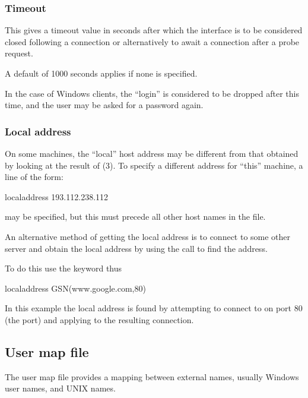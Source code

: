 \subsubsection{Timeout}
This gives a timeout value in seconds after which the interface is to be considered closed following a connection or alternatively to await a
connection after a probe request.

A default of 1000 seconds applies if none is specified.

In the case of Windows clients, the ``login'' is considered to be dropped after this time, and the user may be asked for a password again.

\subsubsection{Local address}
On some machines, the ``local'' host address may be different from that obtained by looking at the result of (3). To specify a different address for ``this'' machine, a line of the form:

\begin{expara}

localaddress 193.112.238.112

\end{expara}

may be specified,  but this must precede all other host names in the file.

An alternative method of getting the local address is to connect to some other server and obtain the local address by using the
 call to find the address.

To do this use the keyword  thus

\begin{expara}

localaddress GSN(www.google.com,80)

\end{expara}

In this example the local address is found by attempting to connect to  on port 80 (the  port) and
applying  to the resulting connection.

\subsection{User map file}
The user map file provides a mapping between external names, usually Windows user names, and UNIX names.

